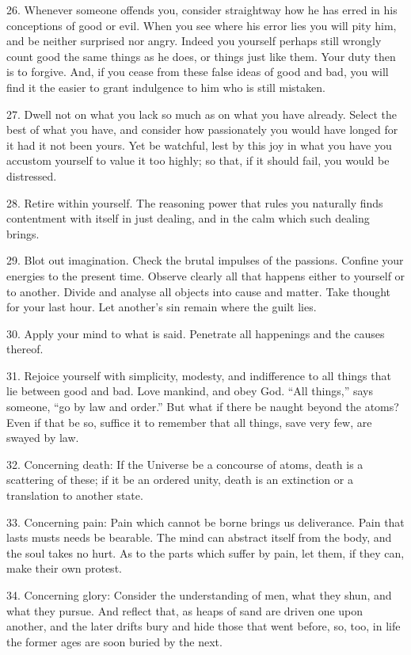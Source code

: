 \documentclass{book}
\begin{document}
26. Whenever someone offends you, consider straightway how he has
erred in his conceptions of good or evil. When you see where his error
lies you will pity him, and be neither surprised nor angry. Indeed you
yourself perhaps still wrongly count good the same things as he does,
or things just like them. Your duty then is to forgive. And, if you
cease from these false ideas of good and bad, you will find it the
easier to grant indulgence to him who is still mistaken.

27. Dwell not on what you lack so much as on what you have
already. Select the best of what you have, and consider how
passionately you would have longed for it had it not been yours. Yet
be watchful, lest by this joy in what you have you accustom yourself
to value it too highly; so that, if it should fail, you would be
distressed.

28. Retire within yourself. The reasoning power that rules you
naturally finds contentment with itself in just dealing, and in the
calm which such dealing brings.

29. Blot out imagination. Check the brutal impulses of the
passions. Confine your energies to the present time. Observe clearly
all that happens either to yourself or to another. Divide and analyse
all objects into cause and matter. Take thought for your last
hour. Let another's sin remain where the guilt lies.

\newpage

30. Apply your mind to what is said. Penetrate all happenings and the
causes thereof.

31. Rejoice yourself with simplicity, modesty, and indifference to all
things that lie between good and bad. Love mankind, and obey God. ``All
things,'' says someone, ``go by law and order.'' But what if there be
naught beyond the atoms? Even if that be so, suffice it to remember
that all things, save very few, are swayed by law.

32. Concerning death: If the Universe be a concourse of atoms, death
is a scattering of these; if it be an ordered unity, death is an
extinction or a translation to another state.

33. Concerning pain: Pain which cannot be borne brings us
deliverance. Pain that lasts musts needs be bearable. The mind can
abstract itself from the body, and the soul takes no hurt. As to the
parts which suffer by pain, let them, if they can, make their own
protest.

34. Concerning glory: Consider the understanding of men, what they
shun, and what they pursue. And reflect that, as heaps of sand are
driven one upon another, and the later drifts bury and hide those that
went before, so, too, in life the former ages are soon buried by the
next.
\end{document}
